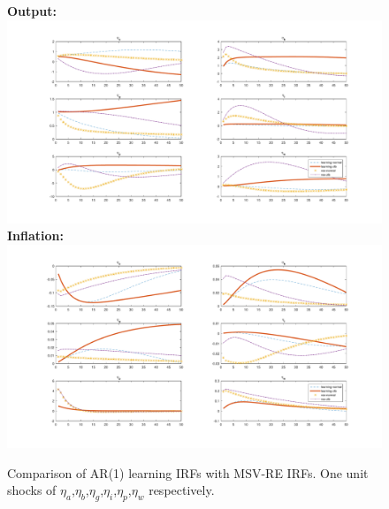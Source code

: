 \documentclass[12pt,reqno]{article}
\numberwithin{equation}{section}
\begin{document}
\begin{figure}[H]
\caption{Comparison of AR(1) learning IRFs with MSV-RE IRFs. One unit shocks of $\eta_a$,$\eta_b$,$\eta_g$,$\eta_i$,$\eta_p$,$\eta_w$ respectively.}
\label{irf_ar1_2}
\textbf{Output:}\\
\includegraphics[scale=0.5]{AR1_impresp_output_riseComp.pdf}
\textbf{Inflation:}\\
\includegraphics[scale=0.5]{AR1_impresp_pinf_riseComp.pdf}

\end{figure}




\end{document}

